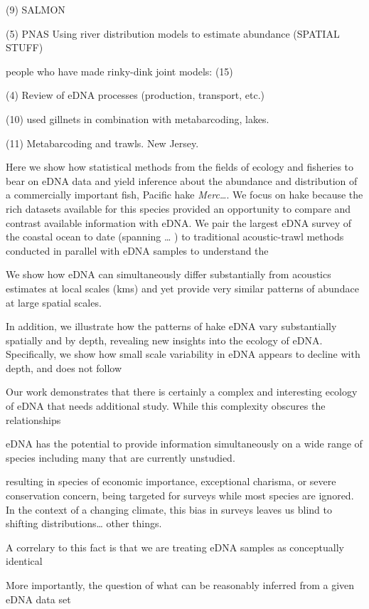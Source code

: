 \documentclass[
]{article}
\begin{document}
(9) SALMON

(5) PNAS Using river distribution models to estimate abundance (SPATIAL
STUFF)

people who have made rinky-dink joint models: (15)

(4) Review of eDNA processes (production, transport, etc.)

(10) used gillnets in combination with metabarcoding, lakes.

(11) Metabarcoding and trawls. New Jersey.

Here we show how statistical methods from the fields of ecology and
fisheries to bear on eDNA data and yield inference about the abundance
and distribution of a commercially important fish, Pacific hake
\emph{Merc\ldots{}}. We focus on hake because the rich datasets
available for this species provided an opportunity to compare and
contrast available information with eDNA. We pair the largest eDNA
survey of the coastal ocean to date (spanning \ldots{} ) to traditional
acoustic-trawl methods conducted in parallel with eDNA samples to
understand the

We show how eDNA can simultaneously differ substantially from acoustics
estimates at local scales (kms) and yet provide very similar patterns of
abundace at large spatial scales.

In addition, we illustrate how the patterns of hake eDNA vary
substantially spatially and by depth, revealing new insights into the
ecology of eDNA. Specifically, we show how small scale variability in
eDNA appears to decline with depth, and does not follow

Our work demonstrates that there is certainly a complex and interesting
ecology of eDNA that needs additional study. While this complexity
obscures the relationships

eDNA has the potential to provide information simultaneously on a wide
range of species including many that are currently unstudied.

resulting in species of economic importance, exceptional charisma, or
severe conservation concern, being targeted for surveys while most
species are ignored. In the context of a changing climate, this bias in
surveys leaves us blind to shifting distributions\ldots{} other things.

A correlary to this fact is that we are treating eDNA samples as
conceptually identical

More importantly, the question of what can be reasonably inferred from a
given eDNA data set
\end{document}
